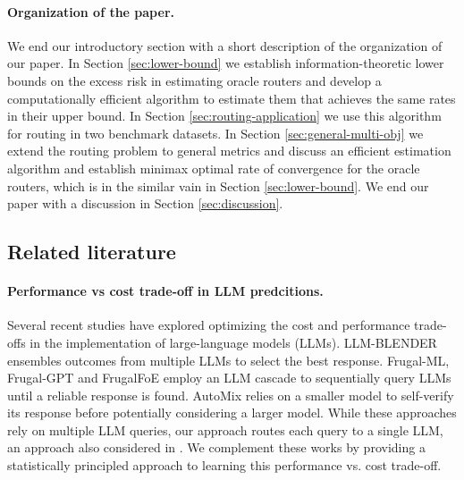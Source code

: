 




\paragraph{Organization of the paper.} We end our introductory section with a short description of the organization of our paper. In Section \ref{sec:lower-bound} we establish information-theoretic lower bounds on the excess risk in estimating oracle routers and develop a computationally efficient algorithm to estimate them that achieves the same rates in their upper bound. In Section \ref{sec:routing-application} we use this algorithm for routing in two benchmark datasets. In Section \ref{sec:general-multi-obj} we extend the routing problem to general metrics and discuss an efficient estimation algorithm and establish minimax optimal rate of convergence for the oracle routers, which is in the similar vain in Section \ref{sec:lower-bound}. We end our paper with a discussion in Section \ref{sec:discussion}. 


\subsection{Related literature}


\paragraph{Performance vs cost trade-off in LLM predcitions.} Several recent studies have explored optimizing the cost and performance trade-offs in the implementation of
large-language models (LLMs). LLM-BLENDER \citep{jiang2023llm} ensembles outcomes from
multiple LLMs to select the best response. Frugal-ML, Frugal-GPT \citep{chen2020frugalml,chen2023frugalgpt} and FrugalFoE \cite{wang2023fusing} employ an LLM cascade to sequentially query LLMs until a reliable response is found. AutoMix \citep{madaan2023automix} relies on a smaller model to self-verify its response before potentially considering a larger model. While these approaches rely
on multiple LLM queries, our approach routes each query to a single LLM, an approach also considered in \citet{hu2024routerbench}. We complement these works by providing a statistically principled approach to learning this performance vs. cost trade-off. 

